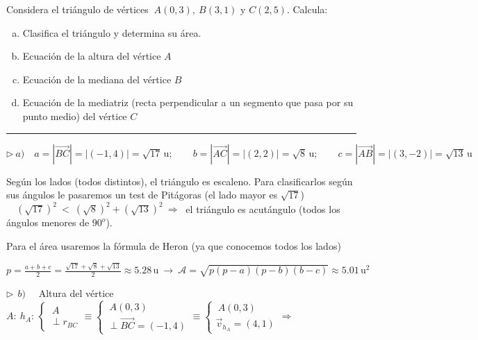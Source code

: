 \begin{miejercicio}

Considera el triángulo de vértices $ \ A(0,3),\ B(3,1) \text{ y } C(2,5)$. Calcula:

\begin{enumerate}[a) ]
\item Clasifica el  triángulo y determina su área.
\item Ecuación de la altura del vértice $A$
\item Ecuación de la mediana del vértice $B$
\item Ecuación de la mediatriz 	\textcolor{gris}{(recta perpendicular a un segmento que pasa por su punto medio)} del vértice $C$	
\end{enumerate}


\rule{250pt}{0.1pt}

\vspace{2mm} \begin{small}$\triangleright \ a) \quad
			  a=|\overrightarrow{BC}|=|(-1,4)|=\sqrt{17}\, \mathrm{u}; 
	\qquad    b=|\overrightarrow{AC}|=|(2,2)|=\sqrt{8}\, \mathrm{u};
	\qquad    c=|\overrightarrow{AB}|=|(3,-2)|=\sqrt{13}\, \mathrm{u}$\end{small}
	
\vspace{2mm} \normalsize{Según} los lados (todos distintos), el triángulo es escaleno. Para clasificarlos según sus ángulos le pasaremos un test de Pitágoras (el lado mayor es $\sqrt{17}$) $\quad (\sqrt{17})^2 \ \boldsymbol{<} \    (\sqrt{8})^2 + (\sqrt{13})^2   \ \Rightarrow   \ $ el triángulo es acutángulo (todos los ángulos menores de $90^o$).

\vspace{2mm} Para el área usaremos la fórmula de Heron (ya que conocemos todos los lados) 

\vspace{2mm} $p=\frac{a+b+c}{2}=\frac{\sqrt{17}+\sqrt{8}+\sqrt{13}}{2}\approx 5.28 \, \mathrm{u} \ \to \ \mathcal A=\sqrt{p(p-a)(p-b)(b-c)}\approx 5.01\, \mathrm{u}^2$

\vspace{5mm} $\triangleright \ \ b) \quad$ Altura del vértice $A:\ h_A: \, \begin{cases} \ A \\ \perp r_{BC} \end{cases} \equiv \begin{cases} \ A(0,3) \\ \perp \overrightarrow{BC}=(-1,4) \end{cases} \equiv \begin{cases} \ A(0,3) \\ \vec v_{h_A}=(4,1) \end{cases} \Rightarrow $


\end{miejercicio}
